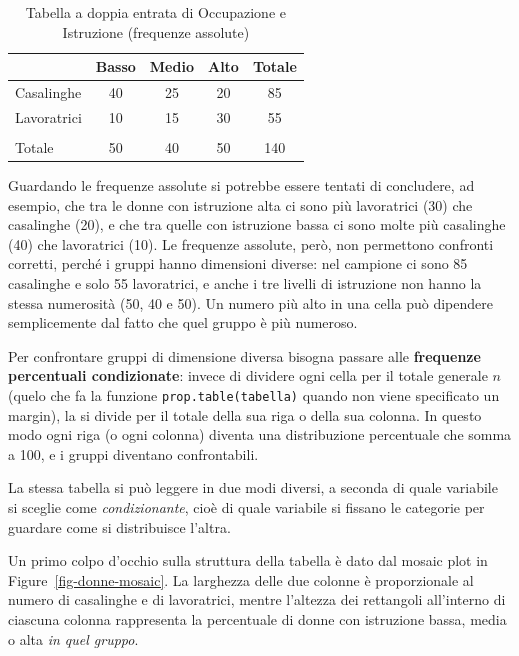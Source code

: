 \documentclass[
  a4paper,
  DIV=11,
  numbers=noendperiod]{scrreprt}
\begin{document}
\begin{longtable}[t]{lcccc}

\caption{\label{tbl-donne-contingenza}Tabella a doppia entrata di
Occupazione e Istruzione (frequenze assolute)}

\tabularnewline

\toprule
 & Basso & Medio & Alto & Totale\\
\midrule
Casalinghe & 40 & 25 & 20 & 85\\
Lavoratrici & 10 & 15 & 30 & 55\\
\midrule\\
Totale & 50 & 40 & 50 & 140\\
\bottomrule

\end{longtable}

Guardando le frequenze assolute si potrebbe essere tentati di
concludere, ad esempio, che tra le donne con istruzione alta ci sono più
lavoratrici (30) che casalinghe (20), e che tra quelle con istruzione
bassa ci sono molte più casalinghe (40) che lavoratrici (10). Le
frequenze assolute, però, non permettono confronti corretti, perché i
gruppi hanno dimensioni diverse: nel campione ci sono 85 casalinghe e
solo 55 lavoratrici, e anche i tre livelli di istruzione non hanno la
stessa numerosità (50, 40 e 50). Un numero più alto in una cella può
dipendere semplicemente dal fatto che quel gruppo è più numeroso.

Per confrontare gruppi di dimensione diversa bisogna passare alle
\textbf{frequenze percentuali condizionate}: invece di dividere ogni
cella per il totale generale \(n\) (quelo che fa la funzione
\texttt{prop.table(tabella)} quando non viene specificato un margin), la
si divide per il totale della sua riga o della sua colonna. In questo
modo ogni riga (o ogni colonna) diventa una distribuzione percentuale
che somma a 100, e i gruppi diventano confrontabili.

La stessa tabella si può leggere in due modi diversi, a seconda di quale
variabile si sceglie come \emph{condizionante}, cioè di quale variabile
si fissano le categorie per guardare come si distribuisce l'altra.

Un primo colpo d'occhio sulla struttura della tabella è dato dal mosaic
plot in Figure~\ref{fig-donne-mosaic}. La larghezza delle due colonne è
proporzionale al numero di casalinghe e di lavoratrici, mentre l'altezza
dei rettangoli all'interno di ciascuna colonna rappresenta la
percentuale di donne con istruzione bassa, media o alta \emph{in quel
gruppo}.
\end{document}
